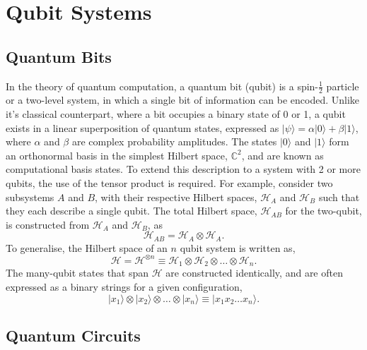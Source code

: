 \newpage
\section{Qubit Systems}
\subsection{Quantum Bits} %

In the theory of quantum computation, a quantum bit (qubit) is a spin-$\frac{1}{2}$ particle or a two-level system, in which a single bit of information can be encoded. 
Unlike it's classical counterpart, where a bit occupies a binary state of 0 or 1, a qubit exists in a linear superposition of quantum states, expressed as 
$|\psi\rangle = \alpha |0\rangle + \beta |1\rangle$, where $\alpha$ and $\beta$ are complex probability amplitudes.
The states $|0\rangle$ and $|1\rangle$ form an orthonormal basis in the simplest Hilbert space, $\mathbb{C}^2$, and are known as computational basis states. 
To extend this description to a system with 2 or more qubits, the use of the tensor product is required. For example, consider two subsystems
$A$ and $B$, with their respective Hilbert spaces, $\mathcal{H}_{A}$ and $\mathcal{H}_{B}$ such that they each describe a single qubit. 
The total Hilbert space, $\mathcal{H}_{AB}$ for the two-qubit, is constructed from $\mathcal{H}_{A}$ and $\mathcal{H}_{B}$, as
\begin{equation}
    \mathcal{H}_{AB} = \mathcal{H}_{A} \otimes \mathcal{H}_{A}.
\end{equation}
To generalise, the Hilbert space of an $n$ qubit system is written as, 
\begin{equation}
    \mathcal{H} = \mathcal{H}^{\otimes n} \equiv \mathcal{H}_{1} \otimes \mathcal{H}_{2} \otimes \dots \otimes \mathcal{H}_{n}. 
\end{equation}
The many-qubit states that span $\mathcal{H}$ are constructed identically, and are often expressed as a binary strings for a given configuration, 
\begin{equation}\label{nqubit}
    |x_1\rangle \otimes |x_2\rangle \otimes \dots \otimes |x_n\rangle \equiv |x_1 x_2 \dots x_n\rangle.
\end{equation}





\subsection{Quantum Circuits}

